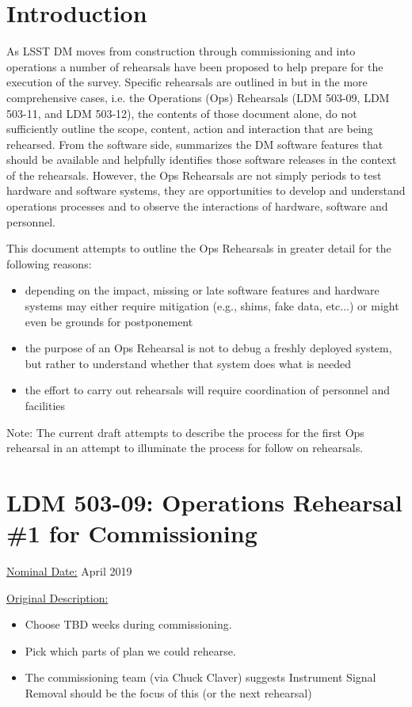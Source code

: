 
\section{Introduction}

As LSST DM moves from construction through commissioning and into operations 
a number of rehearsals have been proposed to help prepare for the execution 
of the survey.  Specific rehearsals are outlined in  but in 
the more comprehensive cases, i.e. the Operations (Ops) Rehearsals (LDM 503-09, LDM 503-11, and 
LDM 503-12), the contents of those document alone, do not sufficiently outline 
the scope, content, action and interaction that are being rehearsed.  
From the software side, 
summarizes the DM software features that should be available and helpfully 
identifies those software releases in the context of the rehearsals.  
However, the Ops Rehearsals are not simply periods to test hardware and 
software systems, they are opportunities to develop and understand operations 
processes and to observe the interactions of hardware, software and personnel.

This document attempts to outline the Ops Rehearsals in greater detail for the following reasons:
\begin{itemize}
\item depending on the impact, missing or late software features and hardware systems may either
require mitigation (e.g., shims, fake data, etc...) or might even be grounds for 
postponement
\item the purpose of an Ops Rehearsal is not to debug 
a freshly deployed system, but rather to understand whether that system does
what is needed
\item the effort to carry out rehearsals will 
require coordination of personnel and facilities
\end{itemize}

Note: The current draft attempts to describe the process for the first Ops 
rehearsal in an attempt to illuminate the process for follow on rehearsals.


\section{LDM 503-09: Operations Rehearsal \#1 for Commissioning}

\underline{Nominal Date:} April 2019

\underline{Original Description:}
\begin{itemize}
\item Choose TBD weeks during commissioning.
\item Pick which parts of plan we could 
rehearse.
\item The commissioning team (via Chuck Claver) suggests Instrument Signal Removal should be the focus 
of this (or the next rehearsal)
\end{itemize}

